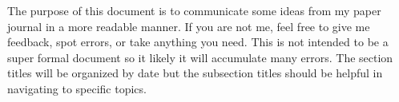 The purpose of this document is to communicate some ideas from my paper journal in a more readable manner. If you are not me, feel free to give me feedback, spot errors, or take anything you need. This is not intended to be a super formal document so it likely it will accumulate many errors. The section titles will be organized by date but the subsection titles should be helpful in navigating to specific topics.


